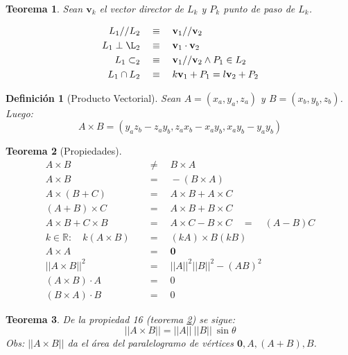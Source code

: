 \documentclass[12pt,a4paper]{extarticle}
\newtheorem{teo}{Teorema}[section]
\newtheorem{mydef}{Definici\'on}[section]
\renewcommand{\b}[1]{\mathbf{#1}}
\begin{document}
\begin{teo}
  Sean \(\b{v}_k\) el vector director de \(L_k\) y \(P_k\) punto de paso de \(L_k\).

  \begin{align}
    L_1 // L_2 \quad &\equiv \quad  \b{v}_1 // \b{v}_2  \\
    L_1 \perp \L_2 \quad &\equiv \quad \b{v}_1 \cdot \b{v}_2\\
    L_1 \subset _2 \quad &\equiv \quad   \b{v}_1 // \b{v}_2 \wedge P_1 \in
                           L_2 \\
    L_1 \cap L_2 \quad &\equiv \quad  k \b{v}_1 + P_1 = l \b{v}_2 + P_2 
  \end{align}
\end{teo}
\begin{mydef}[Producto Vectorial]
  Sean \(A=(x_a, y_a, z_a)\) y \(B=(x_b,y_b,z_b)\). Luego:
  \[A \times B = (y_az_b-z_ay_b, z_ax_b-x_ay_b, x_ay_b-y_ay_b)\]
\end{mydef}
\begin{teo}[Propiedades] \label{teoCrossProps}
  \begin{align}
    A \times B \quad &\neq \quad  B \times A   \\
    A \times B \quad &= \quad -(B \times A) \nonumber \\
    A \times (B+C) \quad &= \quad  A \times B + A \times C \\
    (A+B) \times C \quad &= \quad  A \times B + B \times C \nonumber \\
    A \times B + C \times B  \quad &= \quad  A \times C - B \times C
                                     \quad = \quad (A-B)C\\
    k \in \mathbb{R}: \quad k(A \times B) \quad &= \quad (kA) \times B (kB)\\
    A \times A \quad &= \quad  \b{0} \nonumber \\
    ||A \times B||^2 \quad &= \quad  ||A||^2||B||^2 - (AB)^2\\
    (A \times B) \cdot A \quad &= \quad  0\\
    (B \times A) \cdot B \quad &= \quad  0 \nonumber 
  \end{align}
\end{teo}
\begin{teo}
De la propiedad 16 (teorema \ref{teoCrossProps}) se sigue:
\[||A \times B|| = ||A|| \ ||B|| \  \sin{\theta}\]
Obs: \(||A \times B||\) da el \emph{\'area del paralelogramo} de
v\'ertices   \( \b{0}, A, (A+B), B\).
\end{teo}
\end{document}
